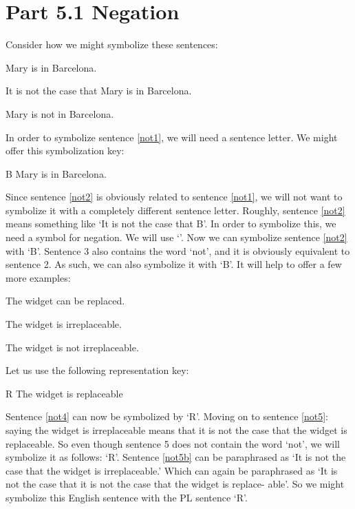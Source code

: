 \section{Part 5.1 Negation }
\label{s:Part 5.1 Negation}
Consider how we might symbolize these sentences:
\begin{earg}
	\item[\ex{not1}] Mary is in Barcelona.
	\item[\ex{not2}] It is not the case that Mary is in Barcelona.
	\item[\ex{not3}] Mary is not in Barcelona.
	\end{earg}
In order to symbolize sentence \ref{not1}, we will need a sentence letter. We might offer this symbolization key:
	\begin{ekey}
		\item[B] Mary is in Barcelona.
	\end{ekey}
Since sentence \ref{not2} is obviously related to sentence \ref{not1}, we will not want to symbolize it with a completely different sentence letter. Roughly, sentence \ref{not2} means something like ‘It is not the case that B’. In order to symbolize this, we need a symbol for \gls{negation}. We will use ‘\enot ’. Now we can symbolize sentence \ref{not2} with ‘\enot B’.
Sentence 3 also contains the word ‘not’, and it is obviously equivalent to sentence 2. As such, we can also symbolize it with ‘\enot B’.
It will help to offer a few more examples:
	\begin{earg}
		\item[\ex{not4}] The widget can be replaced.
		\item[\ex{not5}] The widget is irreplaceable.
		\item[\ex{not5b}] The widget is not irreplaceable.
	\end{earg}
Let us use the following representation key:
	\begin{ekey}
		\item[R] The widget is replaceable
	\end{ekey}
Sentence \ref{not4} can now be symbolized by ‘R’. Moving on to sentence \ref{not5}: saying the widget is irreplaceable means that it is not the case that the widget is replaceable. So even though sentence 5 does not contain the word ‘not’, we will symbolize it as follows: ‘\enot R’.
Sentence \ref{not5b} can be paraphrased as ‘It is not the case that the widget is irreplaceable.’ Which can again be paraphrased as ‘It is not the case that it is not the case that the widget is replace- able’. So we might symbolize this English sentence with the PL sentence ‘\enot \enot R’.
